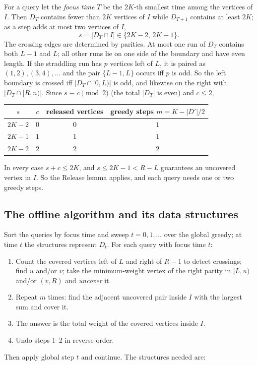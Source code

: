 \documentclass[11pt]{article}
\begin{document}
For a query let the \emph{focus time} $T$ be the $2K$-th smallest time
among the vertices of $I$. Then $D_T$ contains fewer than $2K$ vertices
of $I$ while $D_{T+1}$ contains at least $2K$; as a step adds at most two
vertices of $I$,
\[ s=|D_T\cap I|\in\{2K-2,\,2K-1\}. \]
The crossing edges are determined by parities. At most one run of $D_T$
contains both $L-1$ and $L$; all other runs lie on one side of the boundary
and have even length. If the straddling run has $p$ vertices left of $L$, it is
paired as $(1,2),(3,4),\dots$ and the pair $\{L-1,L\}$ occurs iff $p$ is odd.
So the left boundary is crossed iff $|D_T\cap[0,L)|$ is odd, and likewise on
the right with $|D_T\cap[R,n)|$. Since $s\equiv c\pmod 2$ (the total $|D_T|$ is even) and $c\le2$,
\begin{center}\small\sffamily
\begin{tabular}{@{}cccc@{}}
\toprule
$s$ & $c$ & released vertices & greedy steps $m=K-|D'|/2$\\
\midrule
$2K-2$ & $0$ & $0$ & $1$\\
$2K-1$ & $1$ & $1$ & $1$\\
$2K-2$ & $2$ & $2$ & $2$\\
\bottomrule
\end{tabular}
\end{center}
In every case $s+c\le2K$, and $s\le2K-1<R-L$ guarantees an uncovered vertex in
$I$. So the Release lemma applies, and each query needs one or two greedy
steps.

\subsection{The offline algorithm and its data structures}
Sort the queries by focus time and sweep $t=0,1,\dots$ over the global
greedy; at time $t$ the structures represent $D_t$. For each query with
focus time $t$:
\begin{enumerate}[leftmargin=1.8em,itemsep=1pt]
  \item Count the covered vertices left of $L$ and right of $R-1$ to detect
        crossings; find $u$ and/or $v$; take the minimum-weight vertex of the
        right parity in $[L,u)$ and/or $(v,R)$ and \emph{uncover} it.
  \item Repeat $m$ times: find the adjacent uncovered pair inside $I$ with the
        largest sum and cover it.
  \item The answer is the total weight of the covered vertices inside $I$.
  \item Undo steps 1--2 in reverse order.
\end{enumerate}
Then apply global step $t$ and continue. The structures needed are:
\end{document}
